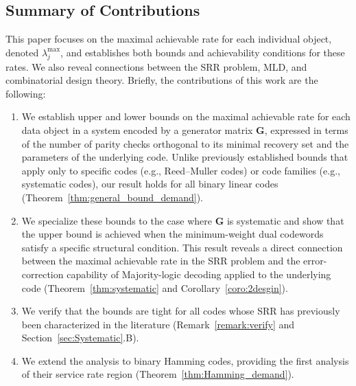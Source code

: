 \documentclass[conference,letterpaper]{IEEEtran}
\begin{document}
\subsection{Summary of Contributions}
This paper focuses on the maximal achievable rate for each individual object, denoted \( \lambda_j^{\max} \), and establishes both bounds and achievability conditions for these rates. 
We also reveal connections between the SRR problem, MLD, and combinatorial design theory. Briefly, the contributions of this work are the following:
\begin{enumerate}
    \item We establish upper and lower bounds on the maximal achievable rate for each data object in a system encoded by a generator matrix \( \boldsymbol{G} \), expressed in terms of the number of parity checks orthogonal to its minimal recovery set and the parameters of the underlying code. Unlike previously established bounds that apply only to specific codes (e.g., Reed--Muller codes) or code families (e.g., systematic codes), our result holds for all binary linear codes (Theorem~\ref{thm:general_bound_demand}).

    \item We specialize these bounds to the case where \( \boldsymbol{G} \) is systematic and show that the upper bound is achieved when the minimum-weight dual codewords satisfy a specific structural condition. This result reveals a direct connection between the maximal achievable rate in the SRR problem and the error-correction capability of Majority-logic decoding applied to the underlying code (Theorem~\ref{thm:systematic} and Corollary~\ref{coro:2desgin}).
    \item We verify that the bounds are tight for all codes whose SRR has previously been characterized in the literature (Remark~\ref{remark:verify} and Section~\ref{sec:Systematic}.B).
    \item We extend the analysis to binary Hamming codes, providing the first analysis of their service rate region (Theorem~\ref{thm:Hamming_demand}). 
\end{enumerate}
\end{document}
